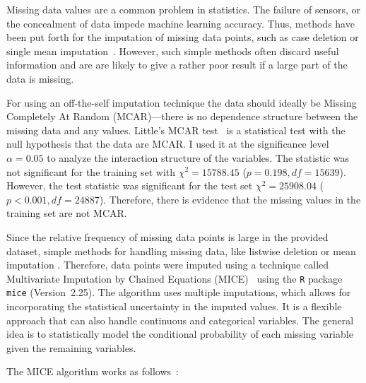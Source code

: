 \documentclass[a4paper]{article}
\begin{document}
Missing data values are a common problem in statistics. The failure of
sensors, or the concealment of data impede machine learning
accuracy. Thus, methods have been put forth for the imputation of
missing data points, such as case deletion or single mean
imputation~\cite{schafer2002missing}. However, such simple methods
often discard useful information and are are likely to give a rather
poor result if a large part
of the data is missing.

For using an off-the-self imputation technique the data should ideally
be Missing Completely At Random (MCAR)---there is no dependence
structure between the missing data and any values. Little's MCAR
test~\cite{little1988test} is a statistical test with the null
hypothesis that the data are MCAR. I used it at the significance level
$\alpha=0.05$ to analyze the interaction structure of the
variables. The statistic was not significant for the training set with
$\chi^2 = 15788.45$ ($p = 0.198, df=15639$).  However, the test
statistic was significant for the test set $\chi^2 = 25908.04$
($p < 0.001, df = 24887$). Therefore, there is evidence that the
missing values in the training set are not MCAR.

Since the relative frequency of missing data points is large in the
provided dataset, simple methods for handling missing data, like
listwise deletion or mean imputation . Therefore, data points were
imputed using a technique called Multivariate Imputation by Chained
Equations (MICE)~\cite{buuren2011mice} using the \texttt{R} package
\texttt{mice} (Version~2.25). The algorithm uses multiple imputations,
which allows for incorporating the statistical uncertainty in the
imputed values. It is a flexible approach that can also handle
continuous and categorical variables. The general idea is to
statistically model the conditional probability of each missing
variable given the remaining variables.

The MICE algorithm works as follows~\cite{buuren2011mice,azur2011multiple}:
\end{document}
